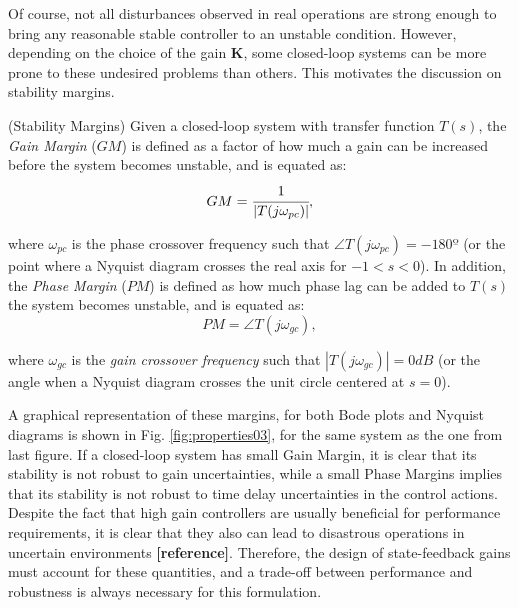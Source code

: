 \documentclass[a4paper,11pt]{book}
\numberwithin{figure}{chapter}
\numberwithin{equation}{chapter}
\numberwithin{table}{chapter}
\theoremstyle{definition}
\newtheorem{definition}{Definition}[chapter]
\newcounter{boxed-theorem}
\newcounter{boxed-definition}
\newenvironment{boxed-definition}[1]
{\colorlet{shadecolor}{pastelYellow!15} \begin{shaded} \begin{definition}{#1}}
{\end{definition} \end{shaded}}
\newcounter{boxed-example}
\begin{document}
Of course, not all disturbances observed in real operations are strong enough to bring any reasonable stable controller to an unstable condition. However, depending on the choice of the gain $\bm{K}$, some closed-loop systems can be more prone to these undesired problems than others. This motivates the discussion on stability margins.

\begin{boxed-definition}{(Stability Margins)}
    Given a closed-loop system with transfer function $T(s)$, the \textit{Gain Margin} ($GM$) is defined as a factor of how much a gain can be increased before the system becomes unstable, and is equated as:
    \begin{equation}
        GM = \cfrac{1}{|T(j \omega_{pc})|}
    ,\end{equation}
    
    \noindent where $\omega_{pc}$ is the phase crossover frequency such that $\angle T(j\omega_{pc}) = -180º$ (or the point where a Nyquist diagram crosses the real axis for $-1 < s < 0$). In addition, the \textit{Phase Margin} ($PM$) is defined as how much phase lag can be added to $T(s)$ the system becomes unstable, and is equated as:
    \begin{equation}
        PM = \angle T(j \omega_{gc})
    ,\end{equation}
    
    \noindent where $\omega_{gc}$ is the \textit{gain crossover frequency} such that $| T(j\omega_{gc}) | = 0 dB$ (or the angle when a Nyquist diagram crosses the unit circle centered at $s = 0$). 
\end{boxed-definition}

A graphical representation of these margins, for both Bode plots and Nyquist diagrams is shown in Fig. \ref{fig:properties03}, for the same system as the one from last figure. If a closed-loop system has small Gain Margin, it is clear that its stability is not robust to gain uncertainties, while a small Phase Margins implies that its stability is not robust to time delay uncertainties in the control actions. Despite the fact that high gain controllers are usually beneficial for performance requirements, it is clear that they also can lead to disastrous operations in uncertain environments \textbf{[reference]}. Therefore, the design of state-feedback gains must account for these quantities, and a trade-off between performance and robustness is always necessary for this formulation. 
\end{document}
